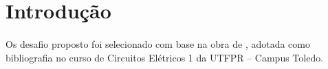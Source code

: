 \section{Introdução}

\paragraph{}
Os desafio proposto foi selecionado com base na obra de
 \cite{alexander2008}, adotada como bibliografia no
curso de Circuitos Elétricos 1 da UTFPR – Campus Toledo.
